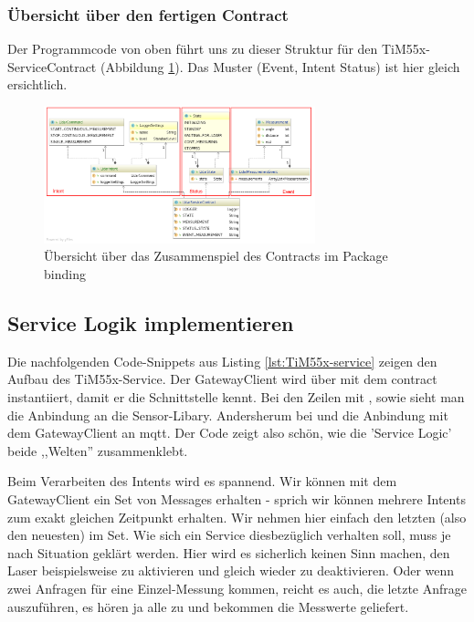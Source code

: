 \subsubsection{Übersicht über den fertigen Contract}
Der Programmcode von oben führt uns zu dieser Struktur für den TiM55x-ServiceContract (Abbildung \ref{fig:tim55x-binding-overview}). Das Muster (Event, Intent Status) ist hier gleich ersichtlich.
\begin{figure}[H]
	\centering
	\includegraphics[width=0.7\textwidth]{img/tim55x-binding-overview.png}
	\caption{Übersicht über das Zusammenspiel des Contracts im Package binding}
	\label{fig:tim55x-binding-overview}
\end{figure}

\subsection{Service Logik implementieren}
\label{sec:service-logik-tim55x}
Die nachfolgenden Code-Snippets aus Listing \ref{lst:TiM55x-service} zeigen den Aufbau des TiM55x-Service. Der GatewayClient wird über  mit dem \Gls{contract} instantiiert, damit er die Schnittstelle kennt. Bei den Zeilen mit ,  sowie  sieht man die Anbindung an die Sensor-Libary. Andersherum bei  und  die Anbindung mit dem GatewayClient an \acrshort{mqtt}. Der Code zeigt also schön, wie die 'Service Logic' beide ,,Welten'' zusammenklebt.



Beim Verarbeiten des Intents wird es spannend. Wir können mit dem GatewayClient ein Set von Messages erhalten - sprich wir können mehrere Intents zum exakt gleichen Zeitpunkt erhalten. Wir nehmen hier einfach den letzten (also den neuesten) im Set. Wie sich ein Service diesbezüglich verhalten soll, muss je nach Situation geklärt werden. Hier wird es sicherlich keinen Sinn machen, den Laser beispielsweise zu aktivieren und gleich wieder zu deaktivieren. Oder wenn zwei Anfragen für eine Einzel-Messung kommen, reicht es auch, die letzte Anfrage auszuführen, es hören ja alle zu und bekommen die Messwerte geliefert.

